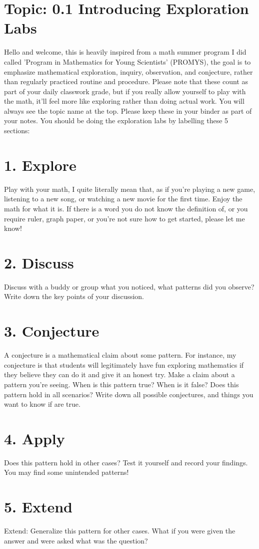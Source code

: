 \documentclass[12pt,letterpaper]{article}
\begin{document}
\section*{Topic: 0.1 Introducing Exploration Labs}
Hello and welcome, this is heavily inspired from a math summer program I did called 'Program in Mathematics for Young Scientists' (PROMYS), the goal is to emphasize mathematical exploration, inquiry, observation, and conjecture, rather than regularly practiced routine and procedure. Please note that these count as part of your daily classwork grade, but if you really allow yourself to play with the math, it'll feel more like exploring rather than doing actual work. You will always see the topic name at the top. Please keep these in your binder as part of your notes. You should be doing the exploration labs by labelling these 5 sections:

\section*{1. Explore}
Play with your math, I quite literally mean that, as if you're playing a new game, listening to a new song, or watching a new movie for the first time. Enjoy the math for what it is. If there is a word you do not know the definition of, or you require ruler, graph paper, or you're not sure how to get started, please let me know!

\section*{2. Discuss}
Discuss with a buddy or group what you noticed, what patterns did you observe?
Write down the key points of your discussion.

\section*{3. Conjecture}
A conjecture is a mathematical claim about some pattern. For instance, my conjecture is that students will legitimately have fun exploring mathematics if they believe they can do it and give it an honest try. Make a claim about a pattern you're seeing. When is this pattern true? When is it false? Does this pattern hold in all scenarios? Write down all possible conjectures, and things you want to know if are true.

\section*{4. Apply}
Does this pattern hold in other cases? Test it yourself and record your findings. You may find some unintended patterns!

\section*{5. Extend}
Extend: Generalize this pattern for other cases. What if you were given the answer and were asked what was the question?
\end{document}
